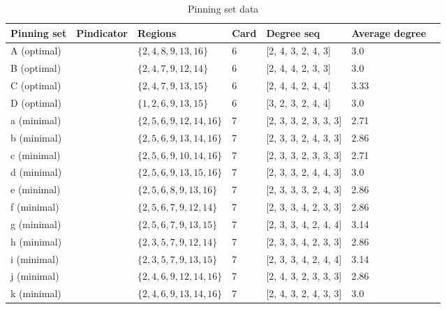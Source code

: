 \documentclass{article}%
\begin{document}
\begin{table}[ht]
	\caption{Pinning set data}
	\centering
	\renewcommand{\arraystretch}{1.5}
	\begin{tabularx}{\textwidth}{lXXXXXX}
		\toprule
			Pinning set & Pindicator & Regions & Card & Degree seq & Average degree\\
			\hline
			A (optimal) & {\Huge\textcolor{red0}{\textbullet}} & $\{2,4,8,9,13,16\}$ & 6 & [2, 4, 3, 2, 4, 3] & 3.0 \\
			B (optimal) & {\Huge\textcolor{red1}{\textbullet}} & $\{2,4,7,9,12,14\}$ & 6 & [2, 4, 4, 2, 3, 3] & 3.0 \\
			C (optimal) & {\Huge\textcolor{red2}{\textbullet}} & $\{2,4,7,9,13,15\}$ & 6 & [2, 4, 4, 2, 4, 4] & 3.33 \\
			D (optimal) & {\Huge\textcolor{red3}{\textbullet}} & $\{1,2,6,9,13,15\}$ & 6 & [3, 2, 3, 2, 4, 4] & 3.0 \\
			a (minimal) & {\Huge\textcolor{green0}{\textbullet}} & $\{2,5,6,9,12,14,16\}$ & 7 & [2, 3, 3, 2, 3, 3, 3] & 2.71 \\
			b (minimal) & {\Huge\textcolor{green1}{\textbullet}} & $\{2,5,6,9,13,14,16\}$ & 7 & [2, 3, 3, 2, 4, 3, 3] & 2.86 \\
			c (minimal) & {\Huge\textcolor{green2}{\textbullet}} & $\{2,5,6,9,10,14,16\}$ & 7 & [2, 3, 3, 2, 3, 3, 3] & 2.71 \\
			d (minimal) & {\Huge\textcolor{green3}{\textbullet}} & $\{2,5,6,9,13,15,16\}$ & 7 & [2, 3, 3, 2, 4, 4, 3] & 3.0 \\
			e (minimal) & {\Huge\textcolor{green4}{\textbullet}} & $\{2,5,6,8,9,13,16\}$ & 7 & [2, 3, 3, 3, 2, 4, 3] & 2.86 \\
			f (minimal) & {\Huge\textcolor{green5}{\textbullet}} & $\{2,5,6,7,9,12,14\}$ & 7 & [2, 3, 3, 4, 2, 3, 3] & 2.86 \\
			g (minimal) & {\Huge\textcolor{green6}{\textbullet}} & $\{2,5,6,7,9,13,15\}$ & 7 & [2, 3, 3, 4, 2, 4, 4] & 3.14 \\
			h (minimal) & {\Huge\textcolor{green7}{\textbullet}} & $\{2,3,5,7,9,12,14\}$ & 7 & [2, 3, 3, 4, 2, 3, 3] & 2.86 \\
			i (minimal) & {\Huge\textcolor{green8}{\textbullet}} & $\{2,3,5,7,9,13,15\}$ & 7 & [2, 3, 3, 4, 2, 4, 4] & 3.14 \\
			j (minimal) & {\Huge\textcolor{green9}{\textbullet}} & $\{2,4,6,9,12,14,16\}$ & 7 & [2, 4, 3, 2, 3, 3, 3] & 2.86 \\
			k (minimal) & {\Huge\textcolor{green10}{\textbullet}} & $\{2,4,6,9,13,14,16\}$ & 7 & [2, 4, 3, 2, 4, 3, 3] & 3.0 \\

\end{tabularx}
\end{table}
\end{document}
